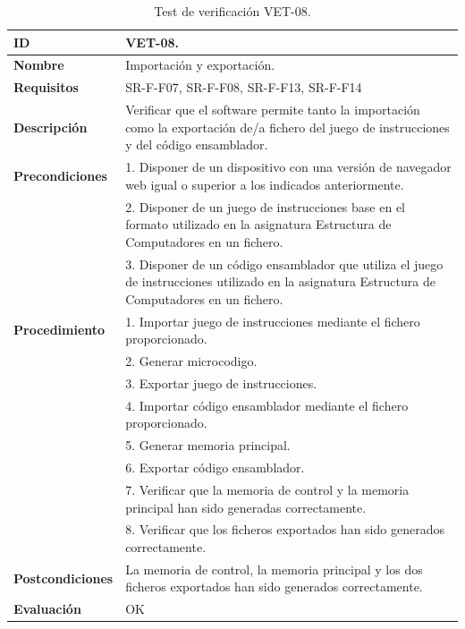 \begin{center}
\begin{table}[htbp]
\centering
\caption{Test de verificación VET-08.}
\begin{tabular}{@{}p{2.5cm} p{13cm}@{}} 
\toprule
\textbf{ID} 					& VET-08. \\
\midrule
\textbf{Nombre} 				& Importación y exportación. \\
\midrule
\textbf{Requisitos} 		& SR-F-F07, SR-F-F08, SR-F-F13, SR-F-F14\\
\midrule
\textbf{Descripción} 		& Verificar que el \gls{software} permite tanto la importación como la exportación de/a fichero del juego de instrucciones y del código \gls{ensamblador}. \\
\midrule
\textbf{Precondiciones}		& 1. Disponer de un dispositivo con una versión de navegador web igual o superior a los indicados anteriormente. \\
											& 2. Disponer de un juego de instrucciones base en el formato utilizado en la asignatura Estructura de Computadores en un fichero. \\
											& 3. Disponer de un código \gls{ensamblador} que utiliza el juego de instrucciones utilizado en la asignatura Estructura de Computadores en un fichero. \\
\midrule
\textbf{Procedimiento}		& 1. Importar juego de instrucciones mediante el fichero proporcionado.\\
											& 2. Generar \gls{microcodigo}.\\
											& 3. Exportar juego de instrucciones.\\
											& 4. Importar código \gls{ensamblador} mediante el fichero proporcionado.\\
											& 5. Generar memoria principal.\\
											& 6. Exportar código \gls{ensamblador}.\\
											& 7. Verificar que la memoria de control y la memoria principal han sido generadas correctamente.\\
											& 8. Verificar que los ficheros exportados han sido generados correctamente.\\
\midrule
\textbf{Postcondiciones} 		&  La memoria de control, la memoria principal y los dos ficheros exportados han sido generados correctamente.\\
\midrule
\textbf{Evaluación} 			& OK \\
\bottomrule
\end{tabular}
\label{tab:vet08}
\end{table}
\end{center}

